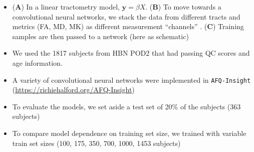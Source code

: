 \documentclass[a0paper,landscape,fontscale=0.365]{baposter}
\begin{document}
\begin{poster}
{\begin{itemize}
\item (\textbf{A}) In a linear tractometry model, $\textbf{y} = \beta X$. (\textbf{B}) To move towards a convolutional neural networks, we stack the data from different tracts and metrics (FA, MD, MK) as different measurement ``channels'' . (\textbf{C}) Training samples are then passed to a network (here as schematic)

\item We used the 1817 subjects from HBN POD2 that had passing QC scores and age
information.

\item A variety of convolutional neural networks were implemented in \texttt{AFQ-Insight} (\url{https://richiehalford.org/AFQ-Insight})

\item To evaluate the models, we set aside a test set of 20\% of the subjects (363 subjects)

\item To compare model dependence on training set size, we trained with variable train set sizes (100, 175, 350, 700, 1000, 1453 subjects)

\end{itemize}
}


\end{poster}
\end{document}
